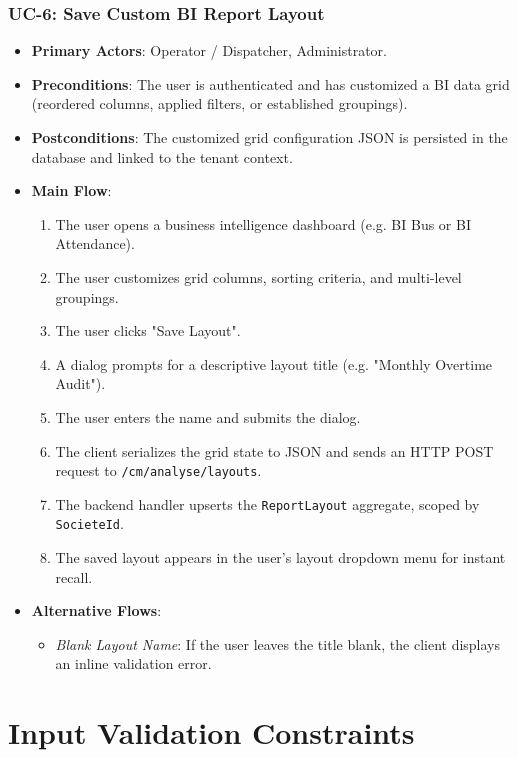 \subsubsection{UC-6: Save Custom BI Report Layout}
\begin{itemize}
  \item \textbf{Primary Actors}: Operator / Dispatcher, Administrator.
  \item \textbf{Preconditions}: The user is authenticated and has customized a BI data grid (reordered columns, applied filters, or established groupings).
  \item \textbf{Postconditions}: The customized grid configuration JSON is persisted in the database and linked to the tenant context.
  \item \textbf{Main Flow}:
  \begin{enumerate}
    \item The user opens a business intelligence dashboard (e.g. BI Bus or BI Attendance).
    \item The user customizes grid columns, sorting criteria, and multi-level groupings.
    \item The user clicks "Save Layout".
    \item A dialog prompts for a descriptive layout title (e.g. "Monthly Overtime Audit").
    \item The user enters the name and submits the dialog.
    \item The client serializes the grid state to JSON and sends an HTTP POST request to \texttt{/cm/analyse/layouts}.
    \item The backend handler upserts the \texttt{ReportLayout} aggregate, scoped by \texttt{SocieteId}.
    \item The saved layout appears in the user's layout dropdown menu for instant recall.
  \end{enumerate}
  \item \textbf{Alternative Flows}:
  \begin{itemize}
    \item \emph{Blank Layout Name}: If the user leaves the title blank, the client displays an inline validation error.
  \end{itemize}
\end{itemize}

\section{Input Validation Constraints}

